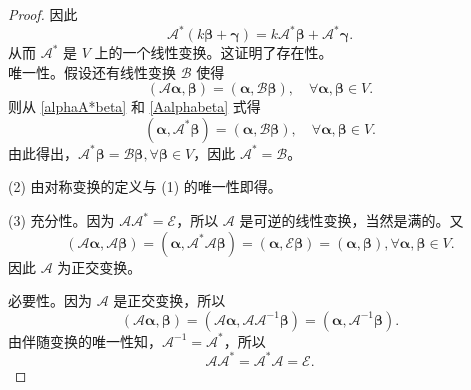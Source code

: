 \begin{enumerate}[1~]
\begin{proof}
因此\[
\mathscr{A}^*(k \boldsymbol{\beta}+\boldsymbol{\gamma})=k \mathscr{A}^{*} \boldsymbol{\beta}+\mathscr{A}^{*} \boldsymbol{\gamma}.
\]
从而 $\mathscr{A}^*$ 是 $V$ 上的一个线性变换。这证明了存在性。\\
唯一性。假设还有线性变换 $\mathscr{B}$ 使得
\begin{equation}\label{Aalphabeta}
\left(\mathscr{A}{\boldsymbol{\alpha}}, \boldsymbol{\beta}\right)=(\boldsymbol{\alpha}, \mathscr{B} \boldsymbol{\beta}), \quad \forall \boldsymbol{\alpha} , \boldsymbol{\beta} \in V.
\end{equation}
则从 \eqref{alphaA*beta} 和 \eqref{Aalphabeta} 式得\[
\left(\boldsymbol{\alpha}, \mathscr{A}^{*} \boldsymbol{\beta}\right)=(\boldsymbol{\alpha}, \mathscr{B} \boldsymbol{\beta}), \quad \forall \boldsymbol{\alpha}, \boldsymbol{\beta} \in V.
\]
由此得出，$\mathscr{A}^{*} \boldsymbol{\beta}=\mathscr{B} {\boldsymbol{\beta}}, \forall \boldsymbol{\beta} \in V$，因此 $\mathscr{A}^*=\mathscr{B}$。

(2) 由对称变换的定义与 (1) 的唯一性即得。

(3) 充分性。因为 $\mathscr{A}\mathscr{A}^*=\mathscr{E}$，所以 $\mathscr{A}$ 是可逆的线性变换，当然是满的。又\[
(\mathscr{A}\boldsymbol{\alpha}, \mathscr{A}\boldsymbol{\beta})=(\boldsymbol{\alpha}, \mathscr{A}^*\mathscr{A}\boldsymbol{\beta})=(\boldsymbol{\alpha}, \mathscr{E}\boldsymbol{\beta})=(\boldsymbol{\alpha}, \boldsymbol{\beta}), \forall \boldsymbol{\alpha} , \boldsymbol{\beta} \in V.
\]
因此 $\mathscr{A}$ 为正交变换。

必要性。因为 $\mathscr{A}$ 是正交变换，所以\[
(\mathscr{A}\boldsymbol{\alpha}, \boldsymbol{\beta}) = (\mathscr{A}\boldsymbol{\alpha}, \mathscr{A}\mathscr{A}^{-1}\boldsymbol{\beta}) = (\boldsymbol{\alpha}, \mathscr{A}^{-1}\boldsymbol{\beta}).
\]
由伴随变换的唯一性知，$\mathscr{A}^{-1}=\mathscr{A}^*$，所以\[
\mathscr { A } \mathscr { A } ^ { * } = \mathscr { A } ^ { * } \mathscr { A } = \mathscr { E }.
\]
\end{proof}
\end{enumerate}

% 
%
%
\endinput






